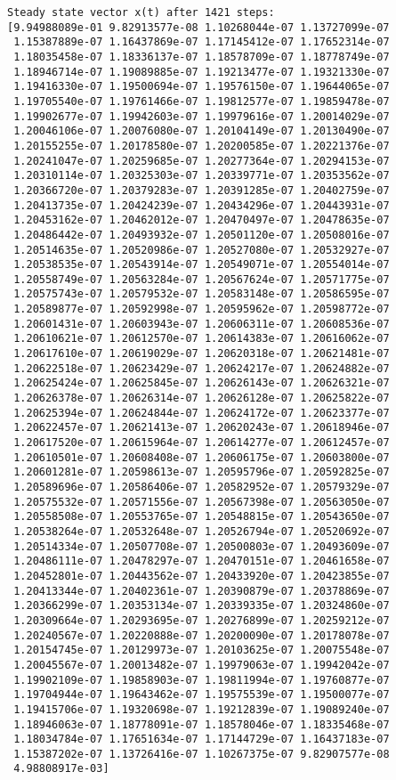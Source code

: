 \documentclass[11pt]{article}
\begin{document}
\begin{Verbatim}[commandchars=\\\{\}]
Steady state vector x(t) after 1421 steps:
[9.94988089e-01 9.82913577e-08 1.10268044e-07 1.13727099e-07
 1.15387889e-07 1.16437869e-07 1.17145412e-07 1.17652314e-07
 1.18035458e-07 1.18336137e-07 1.18578709e-07 1.18778749e-07
 1.18946714e-07 1.19089885e-07 1.19213477e-07 1.19321330e-07
 1.19416330e-07 1.19500694e-07 1.19576150e-07 1.19644065e-07
 1.19705540e-07 1.19761466e-07 1.19812577e-07 1.19859478e-07
 1.19902677e-07 1.19942603e-07 1.19979616e-07 1.20014029e-07
 1.20046106e-07 1.20076080e-07 1.20104149e-07 1.20130490e-07
 1.20155255e-07 1.20178580e-07 1.20200585e-07 1.20221376e-07
 1.20241047e-07 1.20259685e-07 1.20277364e-07 1.20294153e-07
 1.20310114e-07 1.20325303e-07 1.20339771e-07 1.20353562e-07
 1.20366720e-07 1.20379283e-07 1.20391285e-07 1.20402759e-07
 1.20413735e-07 1.20424239e-07 1.20434296e-07 1.20443931e-07
 1.20453162e-07 1.20462012e-07 1.20470497e-07 1.20478635e-07
 1.20486442e-07 1.20493932e-07 1.20501120e-07 1.20508016e-07
 1.20514635e-07 1.20520986e-07 1.20527080e-07 1.20532927e-07
 1.20538535e-07 1.20543914e-07 1.20549071e-07 1.20554014e-07
 1.20558749e-07 1.20563284e-07 1.20567624e-07 1.20571775e-07
 1.20575743e-07 1.20579532e-07 1.20583148e-07 1.20586595e-07
 1.20589877e-07 1.20592998e-07 1.20595962e-07 1.20598772e-07
 1.20601431e-07 1.20603943e-07 1.20606311e-07 1.20608536e-07
 1.20610621e-07 1.20612570e-07 1.20614383e-07 1.20616062e-07
 1.20617610e-07 1.20619029e-07 1.20620318e-07 1.20621481e-07
 1.20622518e-07 1.20623429e-07 1.20624217e-07 1.20624882e-07
 1.20625424e-07 1.20625845e-07 1.20626143e-07 1.20626321e-07
 1.20626378e-07 1.20626314e-07 1.20626128e-07 1.20625822e-07
 1.20625394e-07 1.20624844e-07 1.20624172e-07 1.20623377e-07
 1.20622457e-07 1.20621413e-07 1.20620243e-07 1.20618946e-07
 1.20617520e-07 1.20615964e-07 1.20614277e-07 1.20612457e-07
 1.20610501e-07 1.20608408e-07 1.20606175e-07 1.20603800e-07
 1.20601281e-07 1.20598613e-07 1.20595796e-07 1.20592825e-07
 1.20589696e-07 1.20586406e-07 1.20582952e-07 1.20579329e-07
 1.20575532e-07 1.20571556e-07 1.20567398e-07 1.20563050e-07
 1.20558508e-07 1.20553765e-07 1.20548815e-07 1.20543650e-07
 1.20538264e-07 1.20532648e-07 1.20526794e-07 1.20520692e-07
 1.20514334e-07 1.20507708e-07 1.20500803e-07 1.20493609e-07
 1.20486111e-07 1.20478297e-07 1.20470151e-07 1.20461658e-07
 1.20452801e-07 1.20443562e-07 1.20433920e-07 1.20423855e-07
 1.20413344e-07 1.20402361e-07 1.20390879e-07 1.20378869e-07
 1.20366299e-07 1.20353134e-07 1.20339335e-07 1.20324860e-07
 1.20309664e-07 1.20293695e-07 1.20276899e-07 1.20259212e-07
 1.20240567e-07 1.20220888e-07 1.20200090e-07 1.20178078e-07
 1.20154745e-07 1.20129973e-07 1.20103625e-07 1.20075548e-07
 1.20045567e-07 1.20013482e-07 1.19979063e-07 1.19942042e-07
 1.19902109e-07 1.19858903e-07 1.19811994e-07 1.19760877e-07
 1.19704944e-07 1.19643462e-07 1.19575539e-07 1.19500077e-07
 1.19415706e-07 1.19320698e-07 1.19212839e-07 1.19089240e-07
 1.18946063e-07 1.18778091e-07 1.18578046e-07 1.18335468e-07
 1.18034784e-07 1.17651634e-07 1.17144729e-07 1.16437183e-07
 1.15387202e-07 1.13726416e-07 1.10267375e-07 9.82907577e-08
 4.98808917e-03]



\end{Verbatim}
\end{document}
